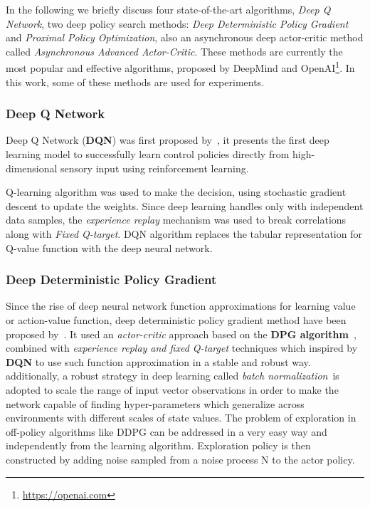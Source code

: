 In the following we briefly discuss four state-of-the-art algorithms, \textit{Deep Q Network}, two deep policy search methods: \textit{Deep Deterministic Policy Gradient} and \textit{Proximal Policy Optimization}, also an asynchronous deep actor-critic method called \textit{Asynchronous Advanced Actor-Critic}.
These methods are currently the most popular and effective algorithms, proposed by DeepMind and OpenAI\footnote{\url{https://openai.com}}. In this work, some of these methods are used for experiments.

\subsubsection{Deep Q Network}
Deep Q Network (\textbf{DQN}) was first proposed by~\parencite{mnih2013playing}, it presents the first deep learning model to successfully learn control policies directly from high-dimensional sensory input using reinforcement learning.

Q-learning algorithm was used to make the decision, using stochastic gradient descent to update the weights. Since deep learning handles only with independent data samples, the \textit{experience replay} mechanism was used to break correlations along with \textit{Fixed Q-target}. DQN algorithm replaces the tabular representation for Q-value function with the deep neural network.

\subsubsection{Deep Deterministic Policy Gradient}
Since the rise of deep neural network function approximations for learning value or action-value function, deep deterministic policy gradient method have been proposed by~\parencite{lillicrap2015continuous}. It used an \textit{actor-critic} approach based on the \textbf{DPG algorithm}~\parencite{silver2014deterministic}, combined with \textit{experience replay and fixed Q-target} techniques which inspired by \textbf{DQN} to use such function approximation in a stable and robust way. additionally, a robust strategy in deep learning called \textit{batch normalization}~\parencite{ioffe2015batch}is  adopted to scale the range of input vector observations in order to make the network capable of finding hyper-parameters which generalize across environments with different scales of state values.
The problem of exploration in off-policy algorithms like DDPG can be addressed in a very easy way and independently from the learning algorithm. Exploration policy is then constructed by adding noise sampled from a noise process N to the actor policy.

